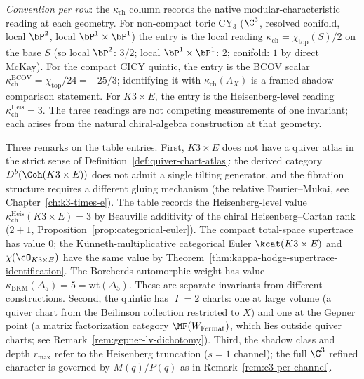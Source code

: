\noindent \emph{Convention per row}: the $\kappa_{\mathrm{ch}}$ column records the native modular-characteristic reading at each geometry. For non-compact toric CY$_3$ ($\C^3$, resolved conifold, local $\bP^2$, local $\bP^1\times\bP^1$) the entry is the local reading $\kappa_{\mathrm{ch}}=\chi_{\mathrm{top}}(S)/2$ on the base $S$ (so local $\bP^2$: $3/2$; local $\bP^1\times\bP^1$: $2$; conifold: $1$ by direct McKay). For the compact CICY quintic, the entry is the BCOV scalar $\kappa_{\mathrm{ch}}^{\mathrm{BCOV}}=\chi_{\mathrm{top}}/24=-25/3$; identifying it with $\kappa_{\mathrm{ch}}(A_X)$ is a framed shadow-comparison statement. For $K3 \times E$, the entry is the Heisenberg-level reading $\kappa_{\mathrm{ch}}^{\mathrm{Heis}}=3$. The three readings are not competing measurements of one invariant; each arises from the natural chiral-algebra construction at that geometry.

\noindent Three remarks on the table entries. First, $K3 \times E$ does not have a quiver atlas in the strict sense of Definition~\ref{def:quiver-chart-atlas}: the derived category $D^b(\Coh(K3 \times E))$ does not admit a single tilting generator, and the fibration structure requires a different gluing mechanism (the relative Fourier--Mukai, see Chapter~\ref{ch:k3-times-e}). The table records the Heisenberg-level value $\kappa_{\mathrm{ch}}^{\mathrm{Heis}}(K3 \times E) = 3$ by Beauville additivity of the chiral Heisenberg--Cartan rank ($2 + 1$, Proposition~\ref{prop:categorical-euler}). The compact total-space supertrace has value $0$; the K\"unneth-multiplicative categorical Euler $\kcat(K3 \times E)$ and $\chi(\cO_{K3 \times E})$ have the same value by Theorem~\ref{thm:kappa-hodge-supertrace-identification}. The Borcherds automorphic weight has value $\kappa_{\mathrm{BKM}}(\Delta_5) = 5 = \mathrm{wt}(\Delta_5)$. These are separate invariants from different constructions. Second, the quintic has $|I| = 2$ charts: one at large volume (a quiver chart from the Beilinson collection restricted to $X$) and one at the Gepner point (a matrix factorization category $\MF(W_{\mathrm{Fermat}})$, which lies outside quiver charts; see Remark~\ref{rem:gepner-lv-dichotomy}). Third, the shadow class and depth $r_{\mathrm{max}}$ refer to the Heisenberg truncation ($s = 1$ channel); the full \(\C^3\) refined character is governed by \(M(q)/P(q)\) as in Remark~\ref{rem:c3-per-channel}.

